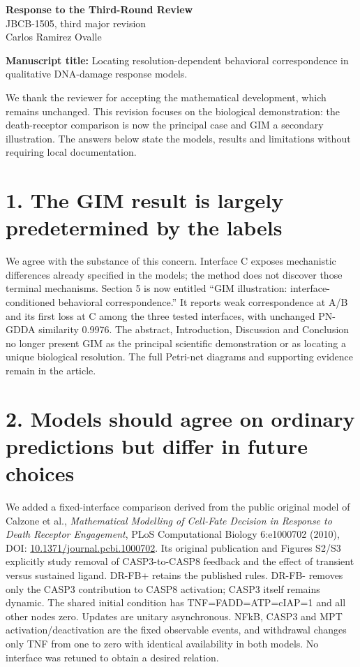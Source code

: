 \documentclass[11pt]{article}
\begin{document}
\begin{center}
{\Large\bfseries Response to the Third-Round Review}\\[6pt]
JBCB-1505, third major revision\\Carlos Ramirez Ovalle
\end{center}
\textbf{Manuscript title:} Locating resolution-dependent behavioral correspondence
in qualitative DNA-damage response models.

We thank the reviewer for accepting the mathematical development, which
remains unchanged. This revision focuses on the biological demonstration:
the death-receptor comparison is now the principal case and GIM a secondary
illustration. The answers below state the models, results and limitations
without requiring local documentation.

\section*{1. The GIM result is largely predetermined by the labels}

We agree with the substance of this concern. Interface C exposes mechanistic
differences already specified in the models; the method does not discover
those terminal mechanisms. Section 5 is now entitled ``GIM illustration:
interface-conditioned behavioral correspondence.'' It reports weak
correspondence at A/B and its first loss at C among the three tested
interfaces, with unchanged PN-GDDA similarity 0.9976. The abstract,
Introduction, Discussion and Conclusion no longer present GIM as the principal
scientific demonstration or as locating a unique biological resolution.
The full Petri-net diagrams and supporting evidence remain in the article.

\section*{2. Models should agree on ordinary predictions but differ in future choices}

We added a fixed-interface comparison derived from the public original model
of Calzone et al., \emph{Mathematical Modelling of Cell-Fate Decision in
Response to Death Receptor Engagement}, PLoS Computational Biology 6:e1000702
(2010), DOI: \href{https://doi.org/10.1371/journal.pcbi.1000702}{10.1371/journal.pcbi.1000702}.
Its original publication and Figures S2/S3 explicitly study removal of
CASP3-to-CASP8 feedback and the effect of transient versus sustained ligand.
DR-FB+ retains the published rules. DR-FB- removes only the CASP3 contribution
to CASP8 activation; CASP3 itself remains dynamic. The shared initial condition
has TNF=FADD=ATP=cIAP=1 and all other nodes zero. Updates are unitary
asynchronous. NFkB, CASP3 and MPT activation/deactivation are the fixed
observable events, and withdrawal changes only TNF from one to zero with
identical availability in both models. No interface was retuned to obtain
a desired relation.
\end{document}
